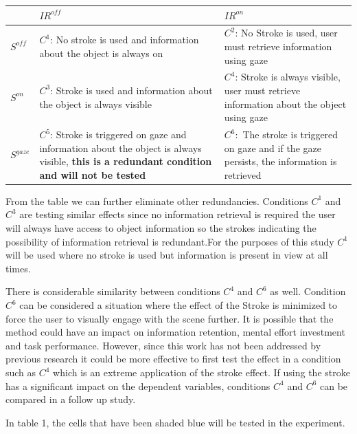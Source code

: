 \documentclass{article}
\begin{document}
 \label{tab:title} 
{\renewcommand{\arraystretch}{2}%
\begin{tabular}{ C{0.1\textwidth} | C{0.375\textwidth} | C{0.375\textwidth}}\toprule[1.5pt]
 & \bf $IR^{ off}$ & \bf  $IR^{ on}$ \\
\hline
\bf $S^{ off}$        &  $C^1$: No stroke is used and information about the object is always on    &  $C^2$: No Stroke is used, user must retrieve information using gaze\\  
\hline
\bf $S^{ on}$        &  $C^3$: Stroke is used and information about the object is always visible     &  $C^4$: Stroke is always visible, user must retrieve information about the object using gaze\\
\hline
\bf $S^{ gaze}$        &  $C^5$: Stroke is triggered on gaze and information about the object is always visible, \bf this is a redundant condition and will not be tested     & $C^6:$ The stroke is triggered on gaze and if the gaze persists, the information is retrieved\\
\hline
\end {tabular}\par
\bigskip

From the table we can further eliminate other redundancies. Conditions $C^1$ and $C^3$ are testing similar effects since no information retrieval is required the user will always have access to object information so the strokes indicating the possibility of information retrieval is redundant.For the purposes of this study $C^1$ will be used where no stroke is used but information is present in view at all times.

There is considerable similarity between conditions $C^4$ and $C^6$ as well. Condition $C^6$ can be considered a situation where the effect of the Stroke is minimized to force the user to visually engage with the scene further. It is possible that the method could have an impact on information retention, mental effort investment and task performance. However, since this work has not been addressed by previous research it could be more effective to first test the effect in a condition such as $C^4$ which is an extreme application of the stroke effect. If using the stroke has a significant impact on the dependent variables, conditions $C^4$ and $C^6$ can be compared in  a follow up study.

In table 1, the cells that have been shaded blue will be tested in the experiment.

}
\end{document}
